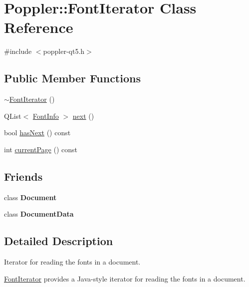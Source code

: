 \hypertarget{class_poppler_1_1_font_iterator}{}\section{Poppler\+:\+:Font\+Iterator Class Reference}
\label{class_poppler_1_1_font_iterator}


{\ttfamily \#include $<$poppler-\/qt5.\+h$>$}

\subsection*{Public Member Functions}
\begin{DoxyCompactItemize}
\item 
\hyperlink{class_poppler_1_1_font_iterator_a7496bc5fe5e6b15b213ac8028d8c4ca3}{$\sim$\+Font\+Iterator} ()
\item 
Q\+List$<$ \hyperlink{class_poppler_1_1_font_info}{Font\+Info} $>$ \hyperlink{class_poppler_1_1_font_iterator_ab33e290dff2467cda4c9ce87a6c5398e}{next} ()
\item 
bool \hyperlink{class_poppler_1_1_font_iterator_a7a3dde96c97c99d1997429e85a4d8451}{has\+Next} () const
\item 
int \hyperlink{class_poppler_1_1_font_iterator_a4a4284eb806e31930585e9550e31a41b}{current\+Page} () const
\end{DoxyCompactItemize}
\subsection*{Friends}
\begin{DoxyCompactItemize}
\item 
\mbox{\label{class_poppler_1_1_font_iterator_a883538034e58fc5c0de7d4e4cab3cef7}} 
class {\bfseries Document}
\item 
\mbox{\label{class_poppler_1_1_font_iterator_a5f30d346de2175fe7a14e3faac37e209}} 
class {\bfseries Document\+Data}
\end{DoxyCompactItemize}


\subsection{Detailed Description}
Iterator for reading the fonts in a document.

\hyperlink{class_poppler_1_1_font_iterator}{Font\+Iterator} provides a Java-\/style iterator for reading the fonts in a document.

